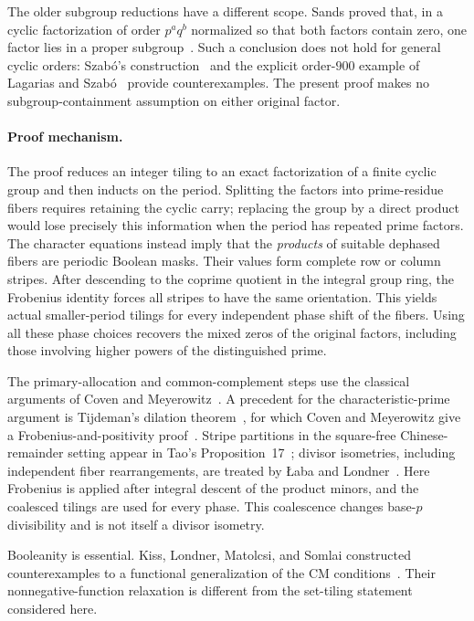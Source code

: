 \documentclass[11pt]{article}
\begin{document}
The older subgroup reductions have a different scope. Sands proved that, in a cyclic factorization of order $p^a q^b$ normalized so that both factors contain zero, one factor lies in a proper subgroup~\cite[Theorem~4]{Sands}. Such a conclusion does not hold for general cyclic orders: Szab\'o's construction~\cite{Szabo} and the explicit order-$900$ example of Lagarias and Szab\'o~\cite[Theorem~2.1]{LagariasSzabo} provide counterexamples. The present proof makes no subgroup-containment assumption on either original factor.

\paragraph{Proof mechanism.}
The proof reduces an integer tiling to an exact factorization of a finite cyclic group and then inducts on the period. Splitting the factors into prime-residue fibers requires retaining the cyclic carry; replacing the group by a direct product would lose precisely this information when the period has repeated prime factors. The character equations instead imply that the \emph{products} of suitable dephased fibers are periodic Boolean masks. Their values form complete row or column stripes. After descending to the coprime quotient in the integral group ring, the Frobenius identity forces all stripes to have the same orientation. This yields actual smaller-period tilings for every independent phase shift of the fibers. Using all these phase choices recovers the mixed zeros of the original factors, including those involving higher powers of the distinguished prime.

The primary-allocation and common-complement steps use the classical arguments of Coven and Meyerowitz~\cite[Lemmas~2.1 and 2.5]{CM}. A precedent for the characteristic-prime argument is Tijdeman's dilation theorem~\cite[Theorem~1]{Tijdeman}, for which Coven and Meyerowitz give a Frobenius-and-positivity proof~\cite[Lemma~3.1]{CM}. Stripe partitions in the square-free Chinese-remainder setting appear in Tao's Proposition~17~\cite{Tao}; divisor isometries, including independent fiber rearrangements, are treated by \L aba and Londner~\cite[Definition~3.3 and Lemma~3.4]{LL}. Here Frobenius is applied after integral descent of the product minors, and the coalesced tilings are used for every phase. This coalescence changes base-$p$ divisibility and is not itself a divisor isometry.

Booleanity is essential. Kiss, Londner, Matolcsi, and Somlai constructed counterexamples to a functional generalization of the CM conditions~\cite{KLMS}. Their nonnegative-function relaxation is different from the set-tiling statement considered here.
\end{document}
